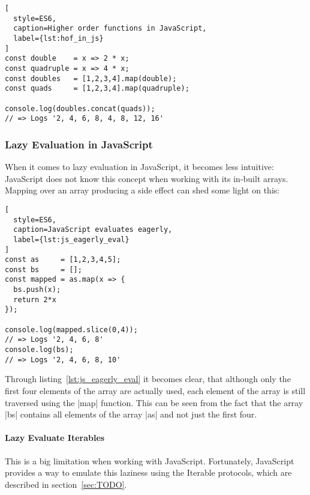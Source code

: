 \begin{lstlisting}[
  style=ES6,
  caption=Higher order functions in JavaScript,
  label={lst:hof_in_js}
]
const double    = x => 2 * x;
const quadruple = x => 4 * x;
const doubles   = [1,2,3,4].map(double);
const quads     = [1,2,3,4].map(quadruple);

console.log(doubles.concat(quads));
// => Logs '2, 4, 6, 8, 4, 8, 12, 16'
\end{lstlisting}


\subsubsection{Lazy Evaluation in JavaScript} %
\label{subsub:Lazy Evaluation in JavaScript}

When it comes to lazy evaluation in JavaScript, it becomes less intuitive:
JavaScript does not know this concept when working with its in-built arrays.
Mapping over an array producing a side effect can shed some light on this:

\begin{lstlisting}[
  style=ES6,
  caption=JavaScript evaluates eagerly,
  label={lst:js_eagerly_eval}
]
const as     = [1,2,3,4,5];
const bs     = [];
const mapped = as.map(x => {
  bs.push(x);
  return 2*x
});

console.log(mapped.slice(0,4));
// => Logs '2, 4, 6, 8'
console.log(bs);
// => Logs '2, 4, 6, 8, 10'
\end{lstlisting}

Through listing~\ref{lst:js_eagerly_eval} it becomes clear, that although only
the first four elements of the array are actually used, each element of the
array is still traversed using the |map| function. This can be seen from the
fact that the array |bs| contains all elements of the array |as| and not just
the first four.
\paragraph{Lazy Evaluate Iterables} %
This is a big limitation when working with JavaScript. Fortunately, JavaScript
provides a way to emulate this laziness using the Iterable protocols, which are
described in section~\ref{sec:TODO}.


